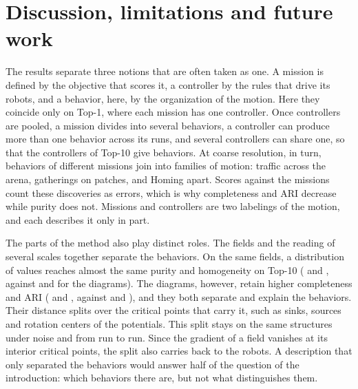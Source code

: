 \documentclass[pdflatex,sn-apa]{sn-jnl}
\begin{document}
\section{Discussion, limitations and future work}
\label{sec:discussion}\label{sec:limits}\label{sec:future}

The results separate three notions that are often taken as one. A mission is defined by the objective that scores it,
a controller by the rules that drive its robots, and a behavior, here, by the organization of the motion. Here they
coincide only on Top-1, where each mission has one controller. Once controllers are pooled, a mission divides into several
behaviors, a controller can produce more than one behavior across its runs, and several controllers can share one, so
that the  controllers of Top-10 give  behaviors. At coarse resolution, in turn, behaviors
of different missions join into families of motion: traffic across the arena, gatherings on patches, and Homing apart.
Scores against the missions count these discoveries as errors, which is why completeness and ARI decrease while purity
does not. Missions and controllers are two labelings of the motion, and each describes it only in part.

{ The parts of the method also play distinct roles. The fields and the reading of several
scales together separate the behaviors. On the same fields, a distribution of values reaches almost the same purity
and homogeneity on Top-10 ( and , against
 and  for the diagrams). The diagrams, however, retain higher
completeness and ARI ( and , against 
and ), and they both separate and explain the behaviors. Their distance splits over the
critical points that carry it, such as sinks, sources and rotation centers of the potentials. This split stays on the
same structures under noise and from run to run. Since the gradient of a field vanishes at its interior critical points,
the split also carries back to the robots. A description that only separated the behaviors would answer half of the
question of the introduction: which behaviors there are, but not what distinguishes them.\par}
\end{document}
